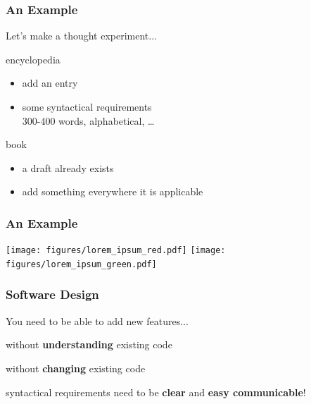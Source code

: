 \documentclass{beamer}
\newenvironment{wideitemize}{
    \itemize\addtolength{\itemsep}{15pt}\addtolength{\topsep}{10pt}}{\enditemize}
\begin{document}
    \begin{frame}
        \frametitle{An Example}
        Let's make a thought experiment...
        \vspace{0.8cm}
        \begin{wideitemize}
            \item encyclopedia
            \begin{itemize}
                \item add an entry
                \item some syntactical requirements\\
                {\small 300-400 words, alphabetical, \ldots}
            \end{itemize}
            \item book
            \begin{itemize}
                \item a draft already exists
                \item add something everywhere it is applicable
            \end{itemize}
        \end{wideitemize}
    \end{frame}

    \begin{frame}
        \frametitle{An Example}\vspace{0.5cm}
        \texttt{[image: figures/lorem\_ipsum\_red.pdf]}%
        \texttt{[image: figures/lorem\_ipsum\_green.pdf]}
    \end{frame}

    \begin{frame}
        \frametitle{Software Design}
        \pause
        You need to be able to add new features...
        \vspace{0.8cm}
        \begin{wideitemize}
            \item without \textbf{understanding} existing code
            \item without \textbf{changing} existing code
            \item syntactical requirements need to be \textbf{clear} and \textbf{easy communicable}!
        \end{wideitemize}
    \end{frame}
\end{document}
